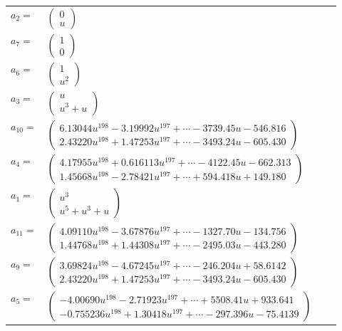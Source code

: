 \documentclass[1p]{elsarticle_modified}
\theoremstyle{definition}
\begin{document}
\begin{tabular}{m{7pt} m{180pt} m{7pt} m{180pt} }
\flushright $a_{2}=$&$\begin{pmatrix}0\\u\end{pmatrix}$ \\
\flushright $a_{7}=$&$\begin{pmatrix}1\\0\end{pmatrix}$ \\
\flushright $a_{6}=$&$\begin{pmatrix}1\\u^2\end{pmatrix}$ \\
\flushright $a_{3}=$&$\begin{pmatrix}u\\u^3+u\end{pmatrix}$ \\
\flushright $a_{10}=$&$\begin{pmatrix}6.13044 u^{198}-3.19992 u^{197}+\cdots-3739.45 u-546.816\\2.43220 u^{198}+1.47253 u^{197}+\cdots-3493.24 u-605.430\end{pmatrix}$ \\
\flushright $a_{4}=$&$\begin{pmatrix}4.17955 u^{198}+0.616113 u^{197}+\cdots-4122.45 u-662.313\\1.45668 u^{198}-2.78421 u^{197}+\cdots+594.418 u+149.180\end{pmatrix}$ \\
\flushright $a_{1}=$&$\begin{pmatrix}u^3\\u^5+u^3+u\end{pmatrix}$ \\
\flushright $a_{11}=$&$\begin{pmatrix}4.09110 u^{198}-3.67876 u^{197}+\cdots-1327.70 u-134.756\\1.44768 u^{198}+1.44308 u^{197}+\cdots-2495.03 u-443.280\end{pmatrix}$ \\
\flushright $a_{9}=$&$\begin{pmatrix}3.69824 u^{198}-4.67245 u^{197}+\cdots-246.204 u+58.6142\\2.43220 u^{198}+1.47253 u^{197}+\cdots-3493.24 u-605.430\end{pmatrix}$ \\
\flushright $a_{5}=$&$\begin{pmatrix}-4.00690 u^{198}-2.71923 u^{197}+\cdots+5508.41 u+933.641\\-0.755236 u^{198}+1.30418 u^{197}+\cdots-297.396 u-75.4139\end{pmatrix}$ \\

\end{tabular}
\end{document}
